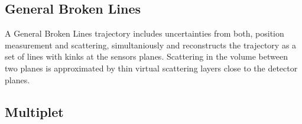 \subsection*{General Broken Lines}
A General Broken Lines trajectory \cite{gbl} includes uncertainties from
both, position measurement and scattering, simultaniously and reconstructs the
trajectory as a set of lines with kinks at the sensors planes. Scattering in
the volume between two planes is approximated by thin virtual scattering
layers close to the detector planes.
\subsection*{Multiplet}

